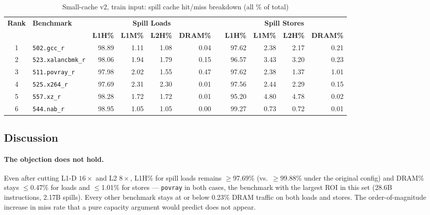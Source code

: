 \documentclass[11pt,a4paper]{article}
\begin{document}
\begin{table}[H]
\centering
\caption{Small-cache v2, train input: spill cache hit/miss breakdown (all \% of total)}
\label{tab:sc_v2_cache}
\small
\begin{tabular}{clrrrrrrrrr}
\toprule
\multirow{2}{*}{\textbf{Rank}} & \multirow{2}{*}{\textbf{Benchmark}} &
\multicolumn{4}{c}{\textbf{Spill Loads}} & \phantom{x} &
\multicolumn{4}{c}{\textbf{Spill Stores}} \\
\cmidrule{3-6}\cmidrule{8-11}
 & & \textbf{L1H\%} & \textbf{L1M\%} & \textbf{L2H\%} & \textbf{DRAM\%} &
   & \textbf{L1H\%} & \textbf{L1M\%} & \textbf{L2H\%} & \textbf{DRAM\%} \\
\midrule
1 & \texttt{502.gcc\_r}       & 98.89 & 1.11 & 1.08 & 0.04 & & 97.62 & 2.38 & 2.17 & 0.21 \\
2 & \texttt{523.xalancbmk\_r} & 98.06 & 1.94 & 1.79 & 0.15 & & 96.57 & 3.43 & 3.20 & 0.23 \\
3 & \texttt{511.povray\_r}    & 97.98 & 2.02 & 1.55 & 0.47 & & 97.62 & 2.38 & 1.37 & 1.01 \\
4 & \texttt{525.x264\_r}      & 97.69 & 2.31 & 2.30 & 0.01 & & 97.56 & 2.44 & 2.29 & 0.15 \\
5 & \texttt{557.xz\_r}        & 98.28 & 1.72 & 1.72 & 0.01 & & 95.20 & 4.80 & 4.78 & 0.02 \\
6 & \texttt{544.nab\_r}       & 98.95 & 1.05 & 1.05 & 0.00 & & 99.27 & 0.73 & 0.72 & 0.01 \\
\bottomrule
\end{tabular}
\end{table}

\subsection{Discussion}

\paragraph{The objection does not hold.} Even after cutting L1-D
$16\times$ and L2 $8\times$, L1H\% for spill loads remains
$\geq$97.69\% (vs.\ $\geq$99.88\% under the original config) and
DRAM\% stays $\leq$0.47\% for loads and $\leq$1.01\% for stores ---
\texttt{povray} in both cases, the benchmark with the largest ROI
in this set (28.6B instructions, 2.17B spills). Every other benchmark
stays at or below 0.23\% DRAM traffic on both loads and stores. The
order-of-magnitude increase in miss rate that a pure capacity argument
would predict does not appear.
\end{document}
